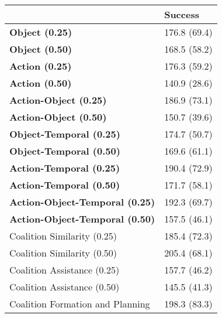 \begin{tabular}{ll}
\hline
                                        & Success      \\
\hline
 \textbf{Object (0.25)}                 & 176.8 (69.4) \\
 \textbf{Object (0.50)}                 & 168.5 (58.2) \\
 \textbf{Action (0.25)}                 & 176.3 (59.2) \\
 \textbf{Action (0.50)}                 & 140.9 (28.6) \\
 \textbf{Action-Object (0.25)}          & 186.9 (73.1) \\
 \textbf{Action-Object (0.50)}          & 150.7 (39.6) \\
 \textbf{Object-Temporal (0.25)}        & 174.7 (50.7) \\
 \textbf{Object-Temporal (0.50)}        & 169.6 (61.1) \\
 \textbf{Action-Temporal (0.25)}        & 190.4 (72.9) \\
 \textbf{Action-Temporal (0.50)}        & 171.7 (58.1) \\
 \textbf{Action-Object-Temporal (0.25)} & 192.3 (69.7) \\
 \textbf{Action-Object-Temporal (0.50)} & 157.5 (46.1) \\
 Coalition Similarity (0.25)            & 185.4 (72.3) \\
 Coalition Similarity (0.50)            & 205.4 (68.1) \\
 Coalition Assistance (0.25)            & 157.7 (46.2) \\
 Coalition Assistance (0.50)            & 145.5 (41.3) \\
 Coalition Formation and Planning       & 198.3 (83.3) \\
\hline
\end{tabular}
